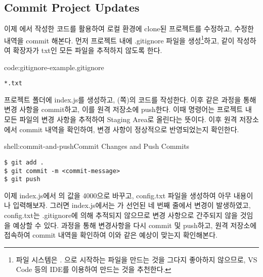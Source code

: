 \subsection*{Commit Project Updates}

이제 에서 작성한 코드를 활용하여 로컬 환경에 clone된 프로젝트를 수정하고, 수정한 내역을 commit 해본다. 먼저 프로젝트 내에 .gitignore 파일을 생성\footnote{파일 시스템은 . 으로 시작하는 파일을 만드는 것을 그다지 좋아하지 않으므로, VS Code 등의 IDE를 이용하여 만드는 것을 추천한다.}하고, \과 같이 작성하여 확장자가 txt인 모든 파일을 추적하지 않도록 한다.

\begin{codeenv}{code:gitignore-example}{.gitignore}\begin{verbatim}
*.txt
\end{verbatim}
\end{codeenv}

프로젝트 폴더에 index.js를 생성하고, (\pageref{code:nodejs-simple-web-server}쪽)의 코드를 작성한다. 이후 \와 같은 과정을 통해 변경 사항을 commit하고, 이를 원격 저장소에 push한다. 이때  명령어는 프로젝트 내 모든 파일의 변경 사항을 추적하여 Staging Area로 올린다는 뜻이다. 이후 원격 저장소에서 commit 내역을 확인하여, 변경 사항이 정상적으로 반영되었는지 확인한다.

\begin{shellenv}{shell:commit-and-push}{Commit Changes and Push Commits}\begin{verbatim}
$ git add .
$ git commit -m <commit-message>
$ git push
\end{verbatim}
\end{shellenv}

이제 index.js에서 의 값을 4000으로 바꾸고, config.txt 파일을 생성하여 아무 내용이나 입력해보자. 그러면 index.js에서는 가 선언된 네 번째 줄에서 변경이 발생하였고, config.txt는 .gitignore에 의해 추적되지 않으므로 변경 사항으로 간주되지 않을 것임을 예상할 수 있다.  과정을 통해 변경사항을 다시 commit 및 push하고, 원격 저장소에 접속하여 commit 내역을 확인하여 이와 같은 예상이 맞는지 확인해본다.
